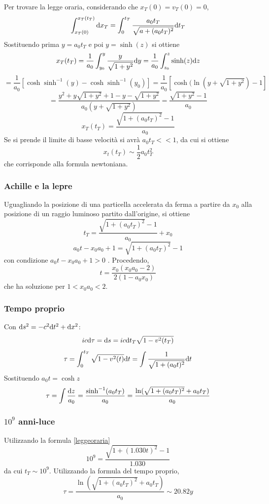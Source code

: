 Per trovare la legge oraria, considerando che \(x_T(0)=v_T(0)=0\),
\[ \int_{x_T(0)}^{x_T(t_T)} \mathrm{d} x_T = \int_0^{t_T} \frac{a_0t_T}{\sqrt{a+(a_0t_T)^2}} \mathrm{d} t_T \]
Sostituendo prima \( y=a_0t_T \) e poi \( y = \sinh(z) \) si ottiene
\[ x_T(t_T) = \frac{1}{a_0} \int_{y_0}^y \frac{y}{\sqrt{1+y^2}} \mathrm{d} y = \frac{1}{a_0} \int_{z_0}^z \sinh(z) \mathrm{d} z \]
\[ = \frac{1}{a_0} [\cosh\sinh^{-1}(y) - \cosh\sinh^{-1}(y_0)]  = \frac{1}{a_0} [\cosh(\ln(y + \sqrt{1+y^2}) -1]\]
\[ = \frac{y^2+y\sqrt{1+y^2}+1-y-\sqrt{1+y^2}}{a_0(y+\sqrt{1+y^2})}  = \frac{\sqrt{1+y^2}-1}{a_0} \]
\begin{equation} \label{leggeoraria}
	x_T(t_T) = \frac{\sqrt{1+(a_0t_T)^2}-1}{a_0} 
\end{equation}
Se si prende il limite di basse velocit\`a si avr\`a \( a_0t_T << 1 \), da cui si ottiene
\[ x_t(t_T) \sim \frac{1}{2}a_0t_T^2 \]
che corrisponde alla formula newtoniana.

\subsubsection{Achille e la lepre}
Uguagliando la posizione di una particella accelerata da ferma a partire da $x_0$ alla posizione di un raggio luminoso partito dall'origine, si ottiene
\[ t_T = \frac{\sqrt{1+(a_0t_T)^2}-1}{a_0} + x_0 \] 
\[ a_0t - x_0a_0 +1 = \sqrt{1+(a_0t_T)^2}-1 \]
con condizione \( a_0t - x_0a_0 +1 >0 \) . Procedendo,
\[ t = \frac{x_0(x_0a_0 -2)}{2(1-a_0x_0)} \]
che ha soluzione per \( 1 < x_0a_0 <2 \).



\subsubsection{Tempo proprio}
Con \(\mathrm{d} s^2 = -c^2\mathrm{d} t^2 + \mathrm{d} x^2 \):
\[ ic\mathrm{d}\tau = \mathrm{d} s = ic\mathrm{d} t_T \sqrt{1-v^2(t_T)} \]
\[ \tau = \int_0^{t_T} \sqrt{1-v^2(t)} \mathrm{d} t = \int \frac{1}{\sqrt{1+(a_0t)^2}} \mathrm{d} t \]
Sostituendo \( a_0t = \cosh z \)
\[ \tau = \int \frac {\mathrm{d} z}{a_0} = \frac{\sinh^{-1}(a_0t_T)}{a_0} = \frac{\ln({\sqrt{1+(a_0t_T)^2}+a_0t_T)}}{a_0}\]

\subsubsection {$10^9$ anni-luce} 
Utilizzando la formula \ref{leggeoraria}
\[ 10^9  = \frac{ \sqrt{1 +(1.030t)^2} -1 }{1.030} \]
da cui \( t_T\sim 10^9 \).
Utilizzando la formula del tempo proprio,
\[ \tau = \frac{ \ln(\sqrt{1+(a_0t_T)^2} + a_0t_T )}{a_0} \sim 20.82 y \]

